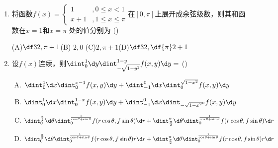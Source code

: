 \begin{enumerate}
  (A)$\df34$\hspace{1cm}(B)$\df12$\hspace{1cm}
  (C)$-\df34$\hspace{1cm}(D)$-\df12$
  \item 将函数$f(x)=\left\{\begin{array}{ll}
  1&,0\leq x<1\\ x+1&,1\leq x\leq \pi
  \end{array}\right.$在$[0,\pi]$上展开成余弦级数，则其和函数在$x=1$和$x=\pi$
  处的值分别为
  (\underline{\hspace{1cm}})
  
  (A)$\df32,\pi+1$\hspace{1cm}(B) $2,0$\hspace{1cm}
  (C)$2,\pi+1$\hspace{1cm}(D)$\df32,\df{\pi}2+1$
  \item 设$f(x)$连续，则$\dint_0^1\d y\dint_{-\sqrt{1-y^2}}^{1-y}f(x,y)\d y=$
  (\underline{\hspace{1cm}})
  \begin{enumerate}[(A)]
    \item $\dint_0^1\d x\dint_{0}^{x-1}f(x,y)\d y
    +\dint_{-1}^0\d x\dint_0^{\sqrt{1-x^2}}f(x,y)\d y$
    \item $\dint_0^1\d x\dint_{0}^{1-x}f(x,y)\d y
    +\dint_{-1}^0\d x\dint_{-\sqrt{1-x^2}^0}f(x,y)\d y$
    \item $\dint_0^{\frac{\pi}2}\d\theta\dint_0^{\frac1{\cos\theta+\sin\theta}}
    f(r\cos\theta,f\sin\theta)\d r+\dint_{\frac{\pi}2}^{\pi}\d\theta
    \dint_0^{\frac1{\cos\theta+\sin\theta}}f(r\cos\theta,f\sin\theta)\d r$
    \item $\dint_0^{\frac{\pi}2}\d\theta\dint_0^{\frac1{\cos\theta+\sin\theta}}
    f(r\cos\theta,f\sin\theta)r\d r+\dint_{\frac{\pi}2}^{\pi}\d\theta
    \dint_0^{\frac1{\cos\theta+\sin\theta}}f(r\cos\theta,f\sin\theta)r\d r$
  \end{enumerate}
  
\end{enumerate}

